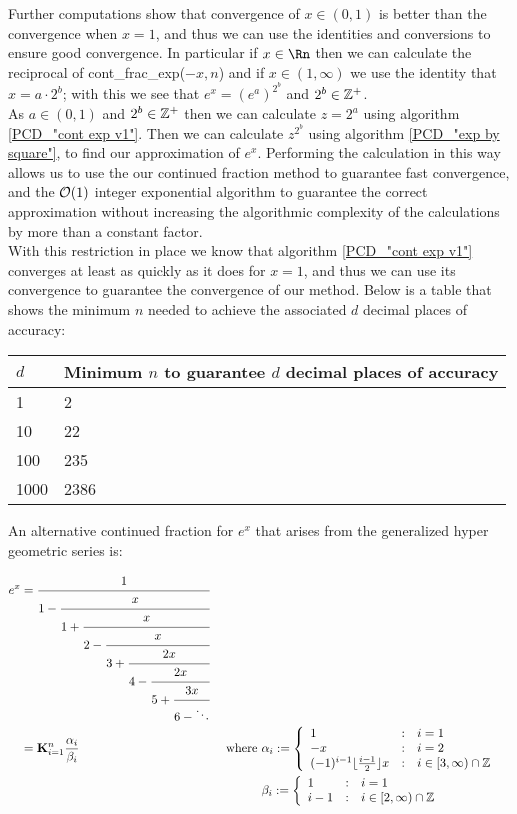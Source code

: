 Further computations show that convergence of \(x \in (0, 1)\) is better than the convergence when \(x=1\), and thus we can use the identities and conversions to ensure good convergence. In particular if \(x \in \Rn\) then we can calculate the reciprocal of \textrm{cont\_frac\_exp(\(-x, n\))} and if \(x \in (1,\infty)\) we use the identity that \(x = a\cdot2^b\); with this we see that \(e^x = (e^a)^{2^b}\) and \(2^b \in \mathbb{Z}^+\).\\

As \(a \in (0,1)\) and \(2^b \in \mathbb{Z}^+\) then we can calculate \(z = 2^a\) using algorithm \ref{PCD_"cont exp v1"}. Then we can calculate \(z^{2^b}\) using algorithm \ref{PCD_"exp by square"}, to find our approximation of \(e^x\). Performing the calculation in this way allows us to use the our continued fraction method to guarantee fast convergence, and the \(\mathcal{O}(1)\) integer exponential algorithm to guarantee the correct approximation without increasing the algorithmic complexity of the calculations by more than a constant factor.\\

With this restriction in place we know that algorithm \ref{PCD_"cont exp v1"} converges at least as quickly as it does for \(x = 1\), and thus we can use its convergence to guarantee the convergence of our method. Below is a table that shows the minimum \(n\) needed to achieve the associated \(d\) decimal places of accuracy:

\begin{center}
\begin{tabular}{|l|l|}
\hline
\(d\) & Minimum \(n\) to guarantee \(d\) decimal places of accuracy\\\hline
1 & 2 \\\hline
10 & 22 \\\hline
100 & 235 \\\hline
1000 & 2386 \\\hline
\end{tabular}
\end{center}

An alternative continued fraction for \(e^x\) that arises from the generalized hyper geometric series\cite{BOK_JoTh80} is:

\begin{align}
e^x &= \cfrac{1}{1 -
	   \cfrac{x}{1 +
	   \cfrac{x}{2 -
	   \cfrac{x}{3 +
	   \cfrac{2x}{4 -
	   \cfrac{2x}{5 +
	   \cfrac{3x}{6 - \ddots} } } } } } } \label{EQN_"exp cont frac 2"}\\
	&= \mathbf{K}_{i=1}^n\frac{\alpha_i}{\beta_i} &\textrm{ where } 
		&\alpha_i := \left\{\begin{array}{lcl}
			1 &:& i = 1\\
			-x &:& i = 2\\
			(-1)^{i-1}\lfloor\frac{i-1}{2}\rfloor x&:&i\in[3,\infty)\cap\mathbb{Z}
			\end{array}\right.\nonumber\\
	&  &&\beta_i := \left\{\begin{array}{lcl}
			1 &:& i=1\\
			i-1 &:& i \in [2, \infty) \cap\mathbb{Z}
			\end{array}\right.\nonumber
\end{align}

